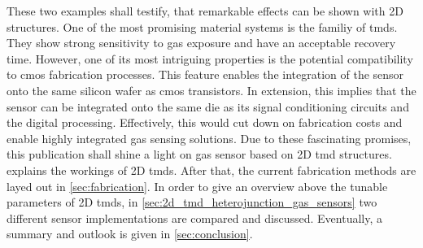 These two examples shall testify, that remarkable effects can be shown with 2D structures. One of the most promising material systems is the familiy of \glspl{tmd}. They show strong sensitivity to gas exposure and have an acceptable recovery time. However, one of its most intriguing properties is the potential compatibility to \gls{cmos} fabrication processes. This feature enables the integration of the sensor onto the same silicon wafer as \gls{cmos} transistors. In extension, this implies that the sensor can be integrated onto the same die as its signal conditioning circuits and the digital processing. Effectively, this would cut down on fabrication costs and enable highly integrated gas sensing solutions. Due to these fascinating promises, this publication shall shine a light on gas sensor based on 2D \gls{tmd} structures.  explains the workings of 2D \glspl{tmd}. After that, the current fabrication methods are layed out in \cref{sec:fabrication}. In order to give an overview above the tunable parameters of 2D \glspl{tmd}, in \cref{sec:2d_tmd_heterojunction_gas_sensors} two different sensor implementations are compared and discussed. Eventually, a summary and outlook is given in \cref{sec:conclusion}.